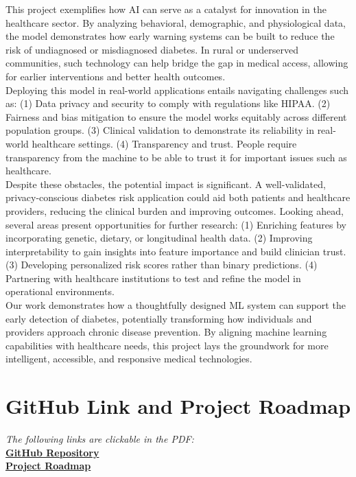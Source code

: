 \documentclass[conference]{IEEEtran}
\begin{document}
This project exemplifies how AI can serve as a catalyst for innovation in the healthcare sector. By analyzing behavioral, demographic, and physiological data, the model demonstrates how early warning systems can be built to reduce the risk of undiagnosed or misdiagnosed diabetes. In rural or underserved communities, such technology can help bridge the gap in medical access, allowing for earlier interventions and better health outcomes. \\

Deploying this model in real-world applications entails navigating challenges such as: (1) Data privacy and security to comply with regulations like HIPAA. (2) Fairness and bias mitigation to ensure the model works equitably across different population groups. (3) Clinical validation to demonstrate its reliability in real-world healthcare settings. (4) Transparency and trust. People require transparency from the machine to be able to trust it for important issues such as healthcare. \\

Despite these obstacles, the potential impact is significant. A well-validated, privacy-conscious diabetes risk application could aid both patients and healthcare providers, reducing the clinical burden and improving outcomes. Looking ahead, several areas present opportunities for further research: (1) Enriching features by incorporating genetic, dietary, or longitudinal health data. (2) Improving interpretability to gain insights into feature importance and build clinician trust. (3) Developing personalized risk scores rather than binary predictions. (4) Partnering with healthcare institutions to test and refine the model in operational environments.\\ 

Our work demonstrates how a thoughtfully designed ML system can support the early detection of diabetes, potentially transforming how individuals and providers approach chronic disease prevention. By aligning machine learning capabilities with healthcare needs, this project lays the groundwork for more intelligent, accessible, and responsive medical technologies.

\section*{GitHub Link and Project Roadmap}

\begin{center}
\textit{The following links are clickable in the PDF:} \\[1em]
\href{https://github.com/LJMurphyy/diabetes-risk-predictor.git}{\textbf{GitHub Repository}} \\[0.5em]
\href{https://docs.google.com/document/d/1y2SnHe8G0xIHGBpmtqj0W4p5EUc5S9HrJr6mLDhpScE/edit?usp=sharing}{\textbf{Project Roadmap}}
\end{center}



\end{document}
